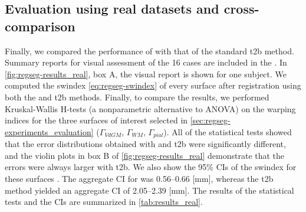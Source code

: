 \subsection{Evaluation using real datasets and cross-comparison}\label{sec:regseg-results_hcp}
Finally, we compared the performance of \regseg{} with that of the standard \gls*{t2b}
  method.
Summary reports for visual assessment of the 16 cases are included in the
  .
In \autoref{fig:regseg-results_real}, box A, the visual report is shown for one subject.
We computed the \gls*{swindex} \eqref{eq:regseg-swindex} of every surface after registration
  using both the \regseg{} and \gls*{t2b} methods.
Finally, to compare the results, we performed Kruskal-Wallis H-tests
  (a nonparametric alternative to ANOVA) on the warping indices for the three surfaces of
  interest selected in \autoref{sec:regseg-experiments_evaluation}
  ($\Gamma_{VdGM}$, $\Gamma_{WM}$, $\Gamma_{pial}$).
All of the statistical tests showed that the error distributions obtained with \regseg{} and
  \gls*{t2b} were significantly different, and the violin plots in box B of
  \autoref{fig:regseg-results_real} demonstrate that the errors were always larger with \gls*{t2b}.
We also show the 95\% CIs of the \gls*{swindex} for these surfaces 
  .
The aggregate CI for \regseg{} was 0.56--0.66 [mm], whereas the \gls*{t2b} method
  yielded an aggregate CI of 2.05--2.39 [mm].
The results of the statistical tests and the CIs are summarized in \autoref{tab:results_real}.

